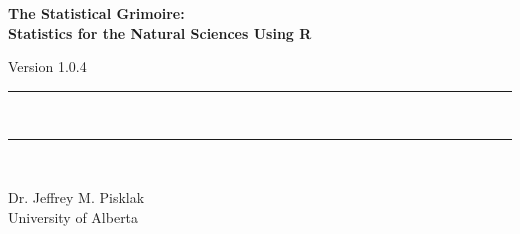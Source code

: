 {}
{
\Huge\bfseries\centering\headingfont The Statistical Grimoire: \\
Statistics for the Natural Sciences Using R\\

\vspace{0.5em}

\small\mdseries\raggedright Version 1.0.4

\rule{\linewidth}{1pt}\\[-6mm]
\rule{\linewidth}{2pt}\\

}

\vskip 2cm

\begin{center}
\Large Dr. Jeffrey M. Pisklak \\
\vspace{0.5em}
\large University of Alberta
\end{center}

\vfill

